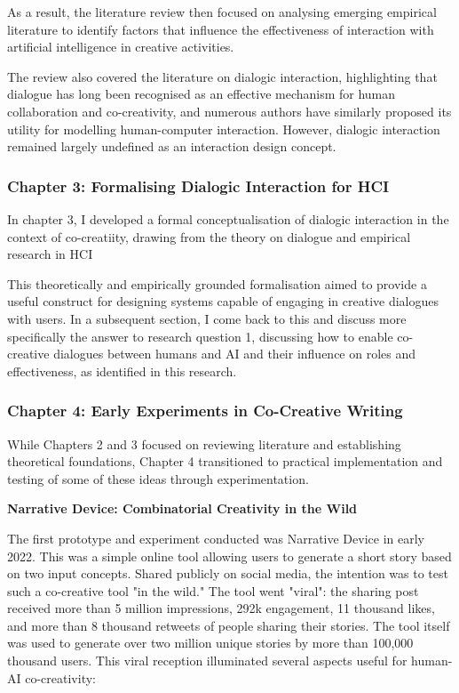 As a result, the literature review then focused on analysing emerging empirical literature to identify factors that influence the effectiveness of interaction with artificial intelligence in creative activities. 

The review also covered the literature on dialogic interaction, highlighting that dialogue has long been recognised as an effective mechanism for human collaboration and co-creativity, and numerous authors have similarly proposed its utility for modelling human-computer interaction. However, dialogic interaction remained largely undefined as an interaction design concept. 

\subsubsection{\textbf{Chapter 3: Formalising Dialogic Interaction for HCI}}

In chapter 3, I developed a formal conceptualisation of dialogic interaction in the context of co-creatiity, drawing from the theory on dialogue and empirical research in HCI 

This theoretically and empirically grounded formalisation aimed to provide a useful construct for designing systems capable of engaging in creative dialogues with users. In a subsequent section, I come back to this and discuss more specifically the answer to research question 1, discussing how to enable co-creative dialogues between humans and AI and their influence on roles and effectiveness, as identified in this research. 

\subsubsection{\textbf{Chapter 4: Early Experiments in Co-Creative Writing}}

While Chapters 2 and 3 focused on reviewing literature and establishing theoretical foundations, Chapter 4 transitioned to practical implementation and testing of some of these ideas through experimentation.

\textbf{Narrative Device: Combinatorial Creativity in the Wild}

The first prototype and experiment conducted was Narrative Device in early 2022. This was a simple online tool allowing users to generate a short story based on two input concepts. Shared publicly on social media, the intention was to test such a co-creative tool "in the wild." The tool went "viral": the sharing post received more than 5 million impressions, 292k engagement, 11 thousand likes, and more than 8 thousand retweets of people sharing their stories. The tool itself was used to generate over two million unique stories by more than 100,000 thousand users. This viral reception illuminated several aspects useful for human-AI co-creativity:

